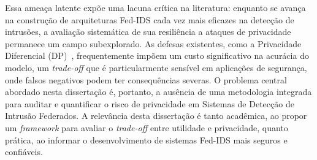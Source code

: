 \documentclass[
	12pt,				%
	openright,			%
	oneside,			%
	a4paper,			%
	english,			%
	french,				%
	spanish,			%
	brazil,				%
	]{abntex2}
\begin{document}
Essa ameaça latente expõe uma lacuna crítica na literatura: enquanto se avança na construção de arquiteturas Fed-IDS cada vez mais eficazes na detecção de intrusões, a avaliação sistemática de sua resiliência a ataques de privacidade permanece um campo subexplorado. As defesas existentes, como a Privacidade Diferencial (DP)~\cite{abadi2016dpsgd}, frequentemente impõem um custo significativo na acurácia do modelo, um \textit{trade-off} que é particularmente sensível em aplicações de segurança, onde falsos negativos podem ter consequências severas. O problema central abordado nesta dissertação é, portanto, a ausência de uma metodologia integrada para auditar e quantificar o risco de privacidade em Sistemas de Detecção de Intrusão Federados. A relevância desta dissertação é tanto acadêmica, ao propor um \textit{framework} para avaliar o \textit{trade-off} entre utilidade e privacidade, quanto prática, ao informar o desenvolvimento de sistemas Fed-IDS mais seguros e confiáveis.
\end{document}
